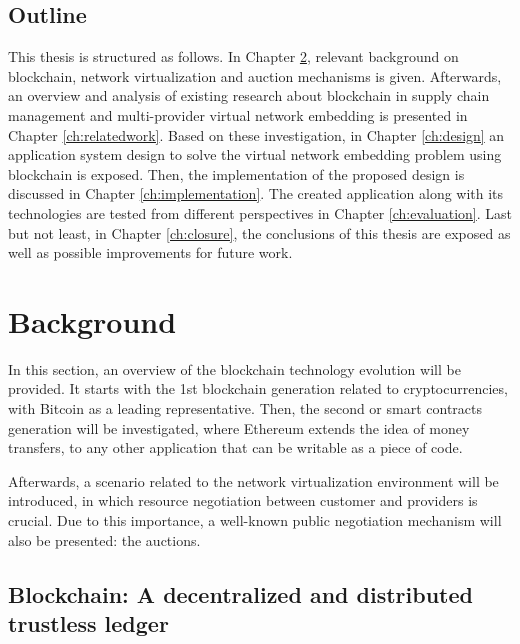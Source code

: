 \section{Outline}

This thesis is structured as follows. In Chapter \ref{ch:background}, relevant background on blockchain, network virtualization and auction mechanisms is given. Afterwards, an overview and analysis of existing research about blockchain in supply chain management and multi-provider virtual network embedding is presented in Chapter \ref{ch:relatedwork}. Based on these investigation, in Chapter \ref{ch:design} an application system design to solve the virtual network embedding problem using blockchain is exposed. Then, the implementation of the proposed design is discussed in Chapter \ref{ch:implementation}. The created application along with its technologies are tested from different perspectives in Chapter \ref{ch:evaluation}. Last but not least, in Chapter \ref{ch:closure}, the conclusions of this thesis are exposed as well as possible improvements for future work.


\chapter{Background}
\label{ch:background}

In this section, an overview of the blockchain technology evolution will be provided. It starts with the 1st blockchain generation related to cryptocurrencies, with Bitcoin as a leading representative. Then, the second or smart contracts generation will be investigated, where Ethereum extends the idea of money transfers, to any other application that can be writable as a piece of code.

Afterwards, a scenario related to the network virtualization environment will be introduced, in which resource negotiation between customer and providers is crucial. Due to this importance, a well-known public negotiation mechanism will also be presented: the auctions.

\section{Blockchain: A decentralized and distributed trustless ledger}

